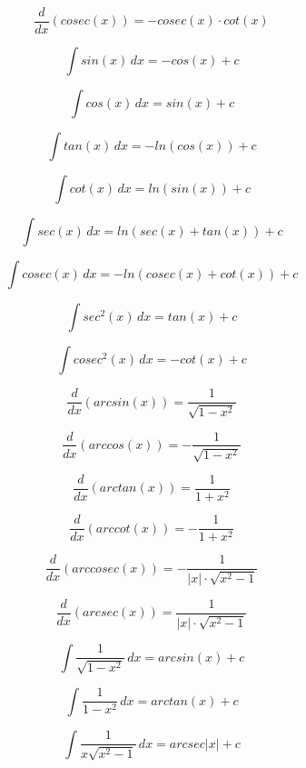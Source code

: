 \documentclass{article}
\begin{document}
    \[
    \frac{d}{dx} \left(cosec(x)\right) = -cosec(x) \cdot cot(x)
    \]

    \[
    \int sin(x) \, dx = -cos(x) + c
    \]
    
    \[
    \int cos(x) \, dx = sin(x) + c
    \]
    
    \[
    \int tan(x) \, dx = -ln\left(cos(x)\right) + c
    \]
    
    \[
    \int cot(x) \, dx = ln\left(sin(x)\right) + c
    \]
    
    \[
    \int sec(x) \, dx = ln\left(sec(x) + tan(x)\right) + c
    \]
    
    \[
    \int cosec(x) \, dx = -ln\left(cosec(x) + cot(x)\right) + c
    \]
    
    \[
    \int sec^2(x) \, dx = tan(x) + c
    \]
    
    \[
    \int cosec^2(x) \, dx = -cot(x) + c
    \]

    \[
    \frac{d}{dx} \left(arcsin(x)\right) = \frac{1}{\sqrt{1-x^2}}
    \]
    
    \[
    \frac{d}{dx} \left(arccos(x)\right) = -\frac{1}{\sqrt{1-x^2}}
    \]
    
    \[
    \frac{d}{dx} \left(arctan(x)\right) = \frac{1}{1+x^2}
    \]

    \[
    \frac{d}{dx} \left(arccot(x)\right) = -\frac{1}{1+x^2}
    \]

    \[
    \frac{d}{dx} \left(arccosec(x)\right) = -\frac{1}{|x| \cdot \sqrt{x^2-1}}
    \]
    
    \[
    \frac{d}{dx} \left(arcsec(x)\right) = \frac{1}{|x| \cdot \sqrt{x^2-1}}
    \]

    \[
    \int \frac{1}{\sqrt{1-x^2}} \, dx = arcsin(x) + c
    \]
    
    \[
    \int \frac{1}{1-x^2} \, dx = arctan(x) + c
    \]
    
    \[
    \int \frac{1}{x \sqrt{x^2-1}} \, dx = arcsec|x| + c
    \]
\\~\\
\end{document}

